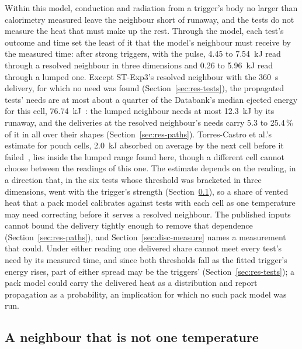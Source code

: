 \documentclass[preprint,12pt]{elsarticle}
\begin{document}
Within this model, conduction and radiation from a trigger's body no larger than calorimetry measured leave the neighbour short of runaway, and the tests do not measure the heat that must make up the rest. Through the model, each test's outcome and time set the least of it that the model's neighbour must receive by the measured time: after strong triggers, with the pulse, 4.45 to 7.54~kJ read through a resolved neighbour in three dimensions and 0.26 to 5.96~kJ read through a lumped one. Except ST-Exp3's resolved neighbour with the 360~s delivery, for which no need was found (Section~\ref{sec:res-tests}), the propagated tests' needs are at most about a quarter of the Databank's median ejected energy for this cell, 76.74~kJ~\cite{finegan2024databank}: the lumped neighbour needs at most 12.3~kJ by its runaway, and the deliveries at the resolved neighbour's needs carry 5.3 to 25.4\,\% of it in all over their shapes (Section~\ref{sec:res-paths}). Torres-Castro et al.'s estimate for pouch cells, 2.0~kJ absorbed on average by the next cell before it failed~\cite{torrescastro2020passive}, lies inside the lumped range found here, though a different cell cannot choose between the readings of this one. The estimate depends on the reading, in a direction that, in the six tests whose threshold was bracketed in three dimensions, went with the trigger's strength (Section~\ref{sec:disc-lumped}), so a share of vented heat that a pack model calibrates against tests with each cell as one temperature may need correcting before it serves a resolved neighbour. The published inputs cannot bound the delivery tightly enough to remove that dependence (Section~\ref{sec:res-paths}), and Section~\ref{sec:disc-measure} names a measurement that could. Under either reading one delivered share cannot meet every test's need by its measured time, and since both thresholds fall as the fitted trigger's energy rises, part of either spread may be the triggers' (Section~\ref{sec:res-tests}); a pack model could carry the delivered heat as a distribution and report propagation as a probability, an implication for which no such pack model was run.

\subsection{A neighbour that is not one temperature}
\label{sec:disc-lumped}
\end{document}
